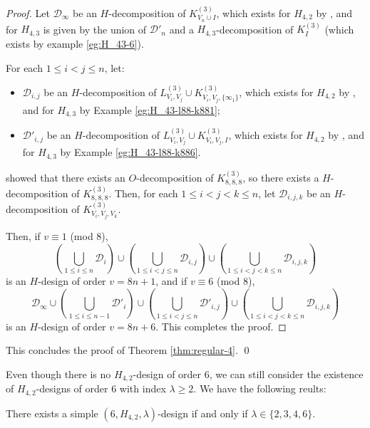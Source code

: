 \begin{proof}
Let $\mathcal{D}_\infty$ be an $H$-decomposition of $K_{V_n \cup I}^{(3)}$,
  which exists for $H_{4,2}$ by \cite{bryant}, and for $H_{4,3}$ is given by
  the union of $\mathcal{D}'_n$ and a $H_{4,3}$-decomposition of $K_{I}^{(3)}$ (which exists by example \ref{eg:H_43-6}).


For each $1 \leq i < j \leq n$, let:
\begin{itemize}
  \item $\mathcal{D}_{i,j}$ be an $H$-decomposition of $L_{V_i,V_j}^{(3)} \cup K_{V_i,V_j,\{\infty_1\}}^{(3)}$,
  which exists for $H_{4,2}$ by \cite{bryant}, and for $H_{4,3}$ by Example \ref{eg:H_43-l88-k881};
  \item $\mathcal{D}'_{i,j}$ be an $H$-decomposition of $L_{V_i,V_j}^{(3)} \cup K_{V_i,V_j,I}^{(3)}$,
  which exists for $H_{4,2}$ by \cite{bryant}, and for $H_{4,3}$ by Example \ref{eg:H_43-l88-k886}.
\end{itemize}

\cite{hanani} showed that there exists an $O$-decomposition of $K_{8,8,8}^{(3)}$, so there exists a $H$-decomposition of $K_{8,8,8}^{(3)}$.
Then, for each $1 \leq i < j < k \leq n$, let $\mathcal{D}_{i,j,k}$ be an $H$-decomposition of $K_{V_i,V_j,V_k}^{(3)}$.

Then, if $v \equiv 1$ (mod 8),
\[
    \left( \bigcup_{1 \leq i \leq n} \mathcal{D}_i \right)
    \cup \left( \bigcup_{1 \leq i < j \leq n} \mathcal{D}_{i,j} \right)
    \cup \left( \bigcup_{1 \leq i < j < k \leq n} \mathcal{D}_{i,j,k} \right)
\]
is an $H$-design of order $v = 8n+1$, and if $v \equiv 6$ (mod 8),
\[
    \mathcal{D}_\infty \cup \left( \bigcup_{1 \leq i \leq n-1}
    \mathcal{D}'_i \right) \cup \left( \bigcup_{1 \leq i < j \leq n}
    \mathcal{D}'_{i,j} \right) \cup \left( \bigcup_{1
    \leq i < j < k \leq n} \mathcal{D}_{i,j,k} \right)
\]
is an $H$-design of order $v = 8n+6$. This completes the proof.

\end{proof}

This concludes the proof of Theorem \ref{thm:regular-4}. \qed

Even though there is no $H_{4,2}$-design of order $6$, we can still consider the existence of $H_{4,2}$-designs of order $6$ with index $\lambda \geq 2$.
We have the following reults:

\begin{theorem} \label{thm:H_42-6-simple}
There exists a simple $(6, H_{4,2}, \lambda)$-design if and only if $\lambda \in \{2, 3, 4, 6\}$.
\end{theorem}

